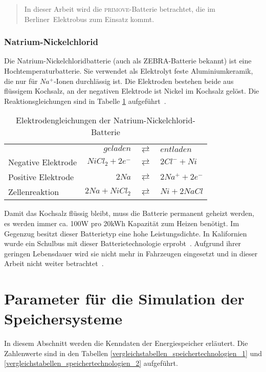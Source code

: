 \begin{quote}
	In dieser Arbeit wird die \textsc{primove}-Batterie betrachtet, die im \mbox{Berliner Elektrobus} zum Einsatz kommt.
\end{quote}

\subsubsection{Natrium-Nickelchlorid}
Die Natrium-Nickelchloridbatterie (auch als ZEBRA-Batterie bekannt) ist eine Hochtemperaturbatterie. Sie verwendet als Elektrolyt feste Aluminiumkeramik, die nur für $Na^+$-Ionen durchlässig ist. Die Elektroden bestehen beide aus flüssigem Kochsalz, an der negativen Elektrode ist Nickel im Kochsalz gelöst. Die Reaktionsgleichungen sind in Tabelle \ref{ZEBRA} aufgeführt~\cite[S. 257ff]{KiehneBattery}.

\begin{table}\centering
	\begin{tabularx}{\linewidth}{XrcX}
		\toprule
		&       $geladen$ & $\rightleftarrows$ & $entladen$           \\
		Negative Elektrode & $NiCl_2 + 2e^-$ & $\rightleftarrows$ & $2Cl^- + Ni$ \\
		Positive Elektrode &           $2Na$ & $\rightleftarrows$ & $2Na^+ + 2e^-$               \\ \midrule
		Zellenreaktion     &  $2Na + NiCl_2$ & $\rightleftarrows$ & $Ni + 2NaCl$ \\ \bottomrule
	\end{tabularx}
	\caption{Elektrodengleichungen der Natrium-Nickelchlorid-Batterie}
	\label{ZEBRA}
\end{table}

Damit das Kochsalz flüssig bleibt, muss die Batterie permanent geheizt werden, es werden immer ca. 100W pro 20kWh Kapazität zum Heizen benötigt. Im Gegenzug besitzt dieser Batterietyp eine hohe Leistungsdichte. In Kalifornien wurde ein Schulbus mit dieser Batterietechnologie erprobt~\cite{Electric-Transportation-Department:2004}. Aufgrund ihrer geringen Lebensdauer wird sie nicht mehr in Fahrzeugen eingesetzt und in dieser Arbeit nicht weiter betrachtet~\cite[S. 24]{Schimke:2012}.

\section{Parameter für die Simulation der Speichersysteme}
In diesem Abschnitt werden die Kenndaten der Energiespeicher erläutert. Die Zahlenwerte sind in den Tabellen \ref{vergleichstabellen_speichertechnologien_1} und \ref{vergleichstabellen_speichertechnologien_2} aufgeführt.

